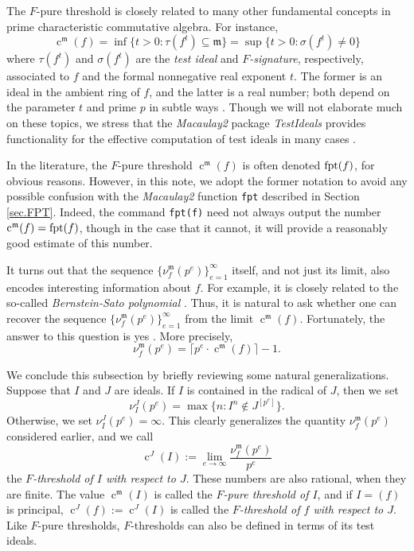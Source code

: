 \documentclass{amsart}
\newcommand{\ft}{\operatorname{c}}
\newcommand{\idealm}{\mathfrak{m}}
\begin{document}
The $F$-pure threshold is closely related to many other fundamental concepts in prime characteristic commutative algebra.   For instance,
\[ \ft^{\idealm}(f) = \inf \{ t>0 : \tau(f^t)  \subseteq \idealm \} = \sup \{ t>0 : \sigma( f^t) \neq 0 \} \]
where $\tau(f^t)$ and $\sigma(f^t)$ are the \emph{test ideal} and \emph{$F$-signature}, respectively, associated to $f$ and the formal nonnegative real exponent $t$.  The former is an ideal in the ambient ring of $f$, and the latter is a real number;  both depend on the parameter $t$ and prime $p$ in subtle ways \cite{BlickleMustataSmithDiscretenessAndRationalityOfFThresholds, BlickleSchwedeTuckerFSigPairs1}.
Though we will not elaborate much on these topics,  we stress that the \emph{Macaulay2} package \emph{TestIdeals} provides functionality for the effective computation of test ideals in many cases \cite{TestIdealsPackage, TestIdealsPaper}.

In the literature, the $F$-pure threshold $\ft^{\idealm}(f)$ is often denoted $\operatorname{{fpt}}(f)$, for obvious reasons.  However, in this note, we adopt the former notation to avoid any possible confusion with the \emph{Macaulay2} function {\tt fpt} described in Section \ref{sec.FPT}.  Indeed, the command {\tt fpt(f)} need not always output the number $\ft^{\idealm}(f) = \fpt(f)$, though in the case that it cannot, it will provide a reasonably good estimate of this number.

It turns out that the sequence $\{ \nu_f^{\idealm}(p^e) \}_{e=1}^{\infty}$ itself, and not just its limit, also encodes interesting information about $f$.  For example, it is closely related to the so-called \emph{Bernstein-Sato polynomial} \cite{MustataTakagiWatanabeFThresholdsAndBernsteinSato}.  Thus, it is natural to ask whether one can recover the sequence $\{ \nu_f^{\idealm}(p^e) \}_{e=1}^{\infty}$ from the limit $\ft^{\idealm}(f)$.  Fortunately, the answer to this question is yes \cite{MustataTakagiWatanabeFThresholdsAndBernsteinSato, HernandezFPurityOfHypersurfaces}. More precisely,
\begin{equation*}
\nu_f^{\idealm}(p^e) = \lceil p^e \cdot \ft^{\idealm}(f) \rceil - 1.
\end{equation*}

We conclude this subsection by briefly reviewing some natural generalizations.  Suppose that $I$ and $J$ are ideals.  If $I$ is contained in the radical of $J$, then we set
%
\[ \nu_I^J(p^e) = \max \{ n : I^n \notin J^{[p^e]} \}. \]
Otherwise, we set $\nu_I^J(p^e) = \infty$.
This clearly generalizes the quantity $\nu_f^{\idealm}(p^e)$ considered earlier, and we call
\[ \ft^J(I) := \lim_{e \to \infty} \frac{ \nu_f^{\idealm}(p^e)}{p^e} \]
the \emph{$F$-threshold of $I$ with respect to $J$}.  These numbers are also rational, when they are finite.
The value $\ft^{\idealm}(I)$ is called the \emph{$F$-pure threshold of $I$}, and if $I = (f)$ is principal,  $\ft^{J}(f) := \ft^J(I)$ is called the \emph{$F$-threshold of $f$ with respect to $J$}.
Like $F$-pure thresholds, $F$-thresholds can also be defined in terms of its test ideals.
\end{document}
